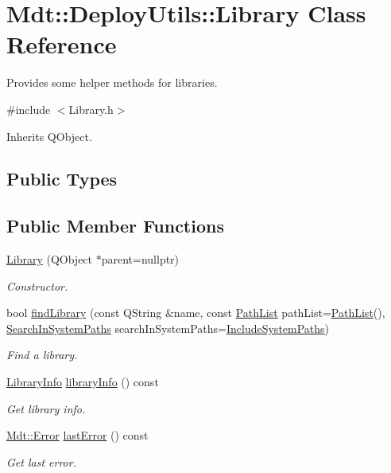 \hypertarget{class_mdt_1_1_deploy_utils_1_1_library}{}\section{Mdt\+:\+:Deploy\+Utils\+:\+:Library Class Reference}
\label{class_mdt_1_1_deploy_utils_1_1_library}


Provides some helper methods for libraries.  




{\ttfamily \#include $<$Library.\+h$>$}



Inherits Q\+Object.

\subsection*{Public Types}
\subsection*{Public Member Functions}
\begin{DoxyCompactItemize}
\item 
\hyperlink{class_mdt_1_1_deploy_utils_1_1_library_ae3d859ad862e026b00d12e50702ae4df}{Library} (Q\+Object $\ast$parent=nullptr)
\begin{DoxyCompactList}\small\item\em Constructor. \end{DoxyCompactList}\item 
bool \hyperlink{class_mdt_1_1_deploy_utils_1_1_library_afeac04ff3404387fc542347849bffeb4}{find\+Library} (const Q\+String \&name, const \hyperlink{class_mdt_1_1_deploy_utils_1_1_path_list}{Path\+List} path\+List=\hyperlink{class_mdt_1_1_deploy_utils_1_1_path_list}{Path\+List}(), \hyperlink{class_mdt_1_1_deploy_utils_1_1_library_ab9f58dba8290dd1882a21d73cc7c10d0}{Search\+In\+System\+Paths} search\+In\+System\+Paths=\hyperlink{class_mdt_1_1_deploy_utils_1_1_library_ab9f58dba8290dd1882a21d73cc7c10d0adabc8cd036aa884536c359cc3a2783ca}{Include\+System\+Paths})
\begin{DoxyCompactList}\small\item\em Find a library. \end{DoxyCompactList}\item 
\hyperlink{class_mdt_1_1_deploy_utils_1_1_library_info}{Library\+Info} \hyperlink{class_mdt_1_1_deploy_utils_1_1_library_a8b272e0c638aa2949b5f19b3c75ed9ae}{library\+Info} () const 
\begin{DoxyCompactList}\small\item\em Get library info. \end{DoxyCompactList}\item 
\hyperlink{class_mdt_1_1_error}{Mdt\+::\+Error} \hyperlink{class_mdt_1_1_deploy_utils_1_1_library_adb9bf35bba0d23731ac97d40fc5fe91d}{last\+Error} () const 
\begin{DoxyCompactList}\small\item\em Get last error. \end{DoxyCompactList}\end{DoxyCompactItemize}


